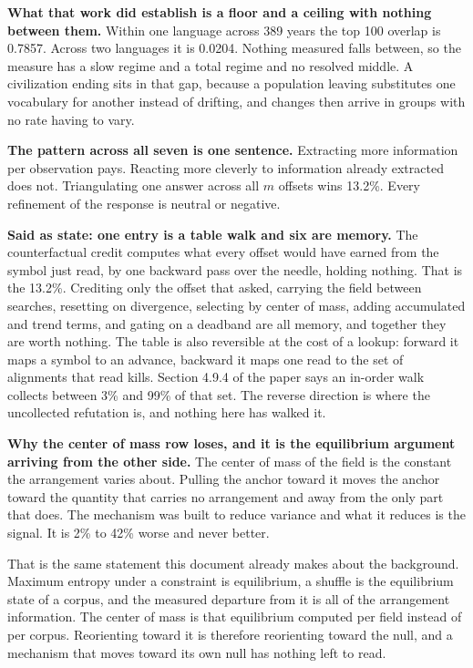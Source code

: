 \textbf{What that work did establish is a floor and a ceiling with nothing between them.} Within one language across 389 years the top 100 overlap is 0.7857. Across two languages it is 0.0204. Nothing measured falls between, so the measure has a slow regime and a total regime and no resolved middle. A civilization ending sits in that gap, because a population leaving substitutes one vocabulary for another instead of drifting, and changes then arrive in groups with no rate having to vary.

\textbf{The pattern across all seven is one sentence.} Extracting more information per observation pays. Reacting more cleverly to information already extracted does not. Triangulating one answer across all \(m\) offsets wins 13.2\%. Every refinement of the response is neutral or negative.

\textbf{Said as state: one entry is a table walk and six are memory.} The counterfactual credit computes what every offset would have earned from the symbol just read, by one backward pass over the needle, holding nothing. That is the 13.2\%. Crediting only the offset that asked, carrying the field between searches, resetting on divergence, selecting by center of mass, adding accumulated and trend terms, and gating on a deadband are all memory, and together they are worth nothing. The table is also reversible at the cost of a lookup: forward it maps a symbol to an advance, backward it maps one read to the set of alignments that read kills. Section 4.9.4 of the paper says an in-order walk collects between 3\% and 99\% of that set. The reverse direction is where the uncollected refutation is, and nothing here has walked it.

\textbf{Why the center of mass row loses, and it is the equilibrium argument arriving from the other side.} The center of mass of the field is the constant the arrangement varies about. Pulling the anchor toward it moves the anchor toward the quantity that carries no arrangement and away from the only part that does. The mechanism was built to reduce variance and what it reduces is the signal. It is 2\% to 42\% worse and never better.

That is the same statement this document already makes about the background. Maximum entropy under a constraint is equilibrium, a shuffle is the equilibrium state of a corpus, and the measured departure from it is all of the arrangement information. The center of mass is that equilibrium computed per field instead of per corpus. Reorienting toward it is therefore reorienting toward the null, and a mechanism that moves toward its own null has nothing left to read.

